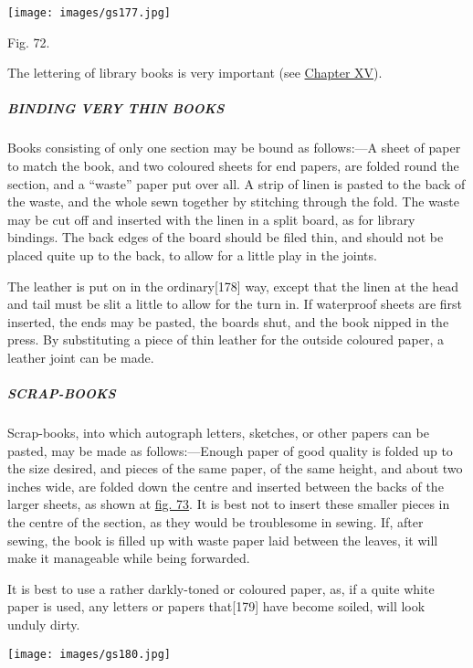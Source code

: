 \documentclass[
]{article}
\begin{document}
\protect\hypertarget{Fig_72}{}{}
\texttt{[image: images/gs177.jpg]}

Fig. 72.

The lettering of library books is very important (see
\protect\hyperlink{CHAPTER_XV}{Chapter XV}).

\hypertarget{binding-very-thin-books}{%
\subparagraph{BINDING VERY THIN BOOKS}\label{binding-very-thin-books}}

Books consisting of only one section may be bound as follows:---A sheet
of paper to match the book, and two coloured sheets for end papers, are
folded round the section, and a ``waste'' paper put over all. A strip of
linen is pasted to the back of the waste, and the whole sewn together by
stitching through the fold. The waste may be cut off and inserted with
the linen in a split board, as for library bindings. The back edges of
the board should be filed thin, and should not be placed quite up to the
back, to allow for a little play in the joints.

The leather is put on in the
ordinary{\protect\hypertarget{Page_178}{}{{[}178{]}}} way, except that
the linen at the head and tail must be slit a little to allow for the
turn in. If waterproof sheets are first inserted, the ends may be
pasted, the boards shut, and the book nipped in the press. By
substituting a piece of thin leather for the outside coloured paper, a
leather joint can be made.

\hypertarget{scrap-books}{%
\subparagraph{SCRAP-BOOKS}\label{scrap-books}}

Scrap-books, into which autograph letters, sketches, or other papers can
be pasted, may be made as follows:---Enough paper of good quality is
folded up to the size desired, and pieces of the same paper, of the same
height, and about two inches wide, are folded down the centre and
inserted between the backs of the larger sheets, as shown at
\protect\hyperlink{Fig_73}{fig. 73}. It is best not to insert these
smaller pieces in the centre of the section, as they would be
troublesome in sewing. If, after sewing, the book is filled up with
waste paper laid between the leaves, it will make it manageable while
being forwarded.

It is best to use a rather darkly-toned or coloured paper, as, if a
quite white paper is used, any letters or papers
that{\protect\hypertarget{Page_179}{}{{[}179{]}}} have become soiled,
will look unduly dirty.

\protect\hypertarget{Fig_73}{}{}
\texttt{[image: images/gs180.jpg]}
\end{document}
